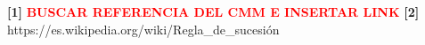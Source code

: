 \textbf{[1]} \textcolor{red}{\textbf{BUSCAR REFERENCIA DEL CMM E INSERTAR LINK}}
\textbf{[2]} https://es.wikipedia.org/wiki/Regla_de_sucesi\'on
